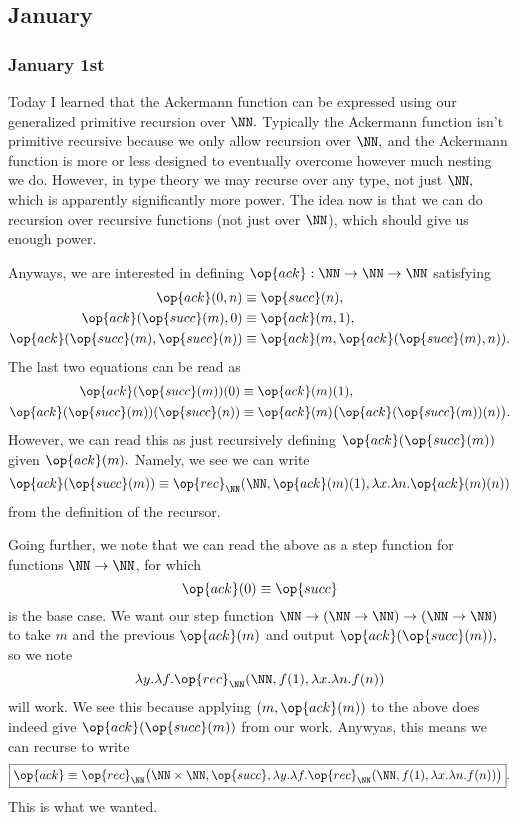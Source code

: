 \subsection{January}

\subsubsection{January 1st}
Today I learned that the Ackermann function can be expressed using our generalized primitive recursion over $\NN.$ Typically the Ackermann function isn't primitive recursive because we only allow recursion over $\NN,$ and the Ackermann function is more or less designed to eventually overcome however much nesting we do. However, in type theory we may recurse over any type, not just $\NN,$ which is apparently significantly more power. The idea now is that we can do recursion over recursive functions (not just over $\NN$), which should give us enough power.

Anyways, we are interested in defining $\op{ack}:\NN\to\NN\to\NN$ satisfying
\begin{align*}
    \op{ack}(0,n) &\equiv \op{succ}(n), \\
    \op{ack}(\op{succ}(m),0) &\equiv \op{ack}(m,1), \\
    \op{ack}(\op{succ}(m),\op{succ}(n)) &\equiv \op{ack}(m,\op{ack}(\op{succ}(m),n)).
\end{align*}
The last two equations can be read as
\begin{align*}
    \op{ack}(\op{succ}(m))(0) &\equiv\op{ack}(m)(1), \\
    \op{ack}(\op{succ}(m))(\op{succ}(n)) &\equiv\op{ack}(m)\big(\op{ack}(\op{succ}(m))(n)\big).
\end{align*}
However, we can read this as just recursively defining $\op{ack}(\op{succ}(m))$ given $\op{ack}(m).$ Namely, we see we can write
\[\op{ack}(\op{succ}(m))\equiv\op{rec}_\NN(\NN,\op{ack}(m)(1),\lambda x.\lambda n.\op{ack}(m)(n))\]
from the definition of the recursor.

Going further, we note that we can read the above as a step function for functions $\NN\to\NN$, for which
\[\op{ack}(0)\equiv\op{succ}\]
is the base case. We want our step function $\NN\to(\NN\to\NN)\to(\NN\to\NN)$ to take $m$ and the previous $\op{ack}(m)$ and output $\op{ack}(\op{succ}(m)),$ so we note
\[\lambda y.\lambda f.\op{rec}_\NN(\NN,f(1),\lambda x.\lambda n.f(n))\]
will work. We see this because applying $(m,\op{ack}(m))$ to the above does indeed give $\op{ack}(\op{succ}(m))$ from our work. Anywyas, this means we can recurse to write
\[\boxed{\op{ack}\equiv\op{rec}_\NN\big(\NN\times\NN,\op{succ},\lambda y.\lambda f.\op{rec}_\NN(\NN,f(1),\lambda x.\lambda n.f(n))\big)}.\]
This is what we wanted.

